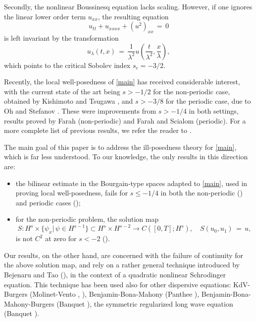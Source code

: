 \documentclass{amsart}
\begin{document}
Secondly, the nonlinear Boussinesq equation lacks scaling. However, if one ignores the linear lower order term $u_{xx}$, the resulting equation 
\begin{equation}
u_{tt}+u_{xxxx}+(u^2)_{xx}\,=\,0\label{new}
\end{equation}
is left invariant by the transformation
\[
u_{\lambda}(t,x)\,=\,\frac{1}{\lambda^2}u\left(\frac{t}{\lambda^2}, \frac{x}{\lambda}\right),
\]
which points to the critical Sobolev index $s_c=-3/2$.

Recently, the local well-posedness of \eqref{main} has received considerable interest, with the current state of the art being $s>-1/2$ for the non-periodic case, obtained by Kishimoto and Tsugawa \cite{KT10}, and $s>-3/8$ for the periodic case, due to Oh and Stefanov \cite{OS12}. These were improvements from $s>-1/4$ in both settings, results proved by  Farah \cite{F09} (non-periodic) and Farah and Scialom \cite{FS10} (periodic). For a more complete list of previous results, we refer the reader to \cite{OS12}.

The main goal of this paper is to address the ill-posedness theory for \eqref{main}, which is far less understood. To our knowledge, the only results in this direction are:

\begin{itemize}

\item the bilinear estimate in the Bourgain-type spaces adapted to \eqref{main}, used in proving local well-posedness, fails for $s\leq -1/4$ in both the non-periodic (\cite{F09}) and periodic cases (\cite{FS10});

\item for the non-periodic problem, the solution map 
\[
S: H^s\times \{\psi_x |\,\psi\in H^{s-1}\}\subset H^s\times H^{s-2} \to C([0,T]; H^s), \quad
S(u_0,u_1)\,=\,u,
\]
is not $C^2$ at zero for $s<-2$ (\cite{F09}).
\end{itemize}

Our results, on the other hand, are concerned with the failure of continuity for the above solution map, and rely on a rather general technique introduced by Bejenaru and Tao (\cite{BT06}), in the context of a quadratic nonlinear Schrodinger equation. This technique has been used also for other dispersive equations: KdV-Burgers (Molinet-Vento \cite{MV10}, \cite{MV09}), Benjamin-Bona-Mahony (Panthee \cite{P11}), Benjamin-Bona-Mahony-Burgers (Banquet \cite{B11}), the symmetric regularized long wave equation (Banquet \cite{B12}). 
\end{document}
